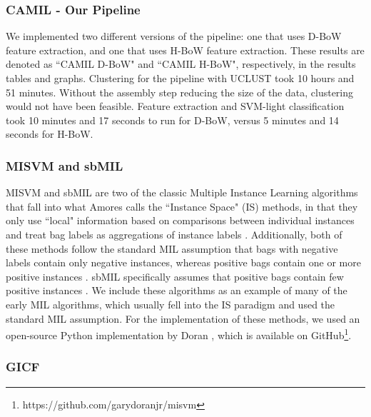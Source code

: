 
\subsubsection{CAMIL - Our Pipeline}

We implemented two different versions of the pipeline: one that uses D-BoW feature extraction, and one that uses H-BoW feature extraction. These results are denoted as ``CAMIL D-BoW" and ``CAMIL H-BoW", respectively, in the results tables and graphs. Clustering for the pipeline with UCLUST took 10 hours and 51 minutes. Without the assembly step reducing the size of the data, clustering would not have been feasible. Feature extraction and SVM-light classification took 10 minutes and 17 seconds to run for D-BoW, versus 5 minutes and 14 seconds for H-BoW.

\subsubsection{MISVM and sbMIL}

MISVM \cite{andrews02} and sbMIL \cite{bunescu07} are two of the classic Multiple Instance Learning algorithms that fall into what Amores calls the ``Instance Space" (IS) methods, in that they only use ``local" information based on comparisons between individual instances and treat bag labels as aggregations of instance labels \cite{amores13}. Additionally, both of these methods follow the standard MIL assumption that bags with negative labels contain only negative instances, whereas positive bags contain one or more positive instances \cite{amores13}. sbMIL specifically assumes that positive bags contain few positive instances \cite{bunescu07}. We include these algorithms as an example of many of the early MIL algorithms, which usually fell into the IS paradigm and used the standard MIL assumption. For the implementation of these methods, we used an open-source Python implementation by Doran \cite{doran14}, which is available on GitHub\footnote{https://github.com/garydoranjr/misvm}.

\subsubsection{GICF}

